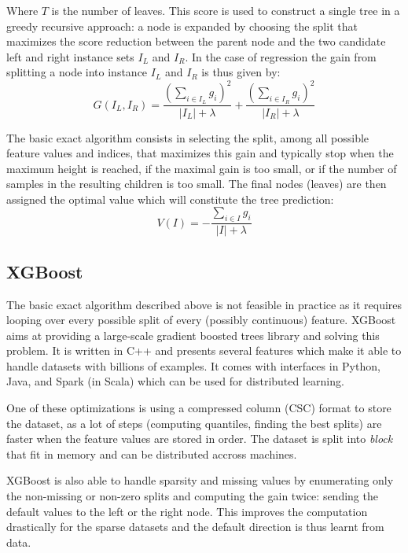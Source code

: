 \documentclass{article}
\theoremstyle{definition}
\begin{document}
Where $T$ is the number of leaves. This score is used to construct a single tree in a greedy recursive approach: a node is expanded by choosing the split that maximizes the score reduction between the parent node and the two candidate left and right instance sets $I_L$ and $I_R$. In the case of regression the gain from splitting a node into instance $I_L$ and $I_R$ is thus given by:
\begin{equation*} 
G(I_L, I_R) = \frac{ \left( \sum_{i \in I_L} g_i \right)^2}{|I_L| + \lambda} + \frac{ \left( \sum_{i \in I_R} g_i \right)^2}{|I_R| + \lambda}
\end{equation*} 

The basic exact algorithm consists in selecting the split, among all possible feature values and indices, that maximizes this gain and typically stop when the maximum height is reached, if the maximal gain is too small, or if the number of samples in the resulting children is too small. The final nodes (leaves) are then assigned the optimal value which will constitute the tree prediction:
\begin{equation}
V(I) = - \frac{\sum_{i \in I} g_i}{\vert I \vert + \lambda}
\label{leafValue}
\end{equation}

\subsection{XGBoost}

The basic exact algorithm described above is not feasible in practice as it requires looping over every possible split of every (possibly continuous) feature. XGBoost aims at providing a large-scale gradient boosted trees library and solving this problem. It is written in C++ and presents several features which make it able to handle datasets with billions of examples. It comes with interfaces in Python, Java, and Spark (in Scala) which can be used for distributed learning. \smallskip 

One of these optimizations is using a compressed column (CSC) format to store the dataset, as a lot of steps (computing quantiles, finding the best splits) are faster when the feature values are stored in order. The dataset is split into \textit{block} that fit in memory and can be distributed accross machines. 

XGBoost is also able to handle sparsity and missing values by enumerating only the non-missing or non-zero splits and computing the gain twice: sending the default values to the left or the right node. This improves the computation drastically for the sparse datasets and the default direction is thus learnt from data.\smallskip 
\end{document}
